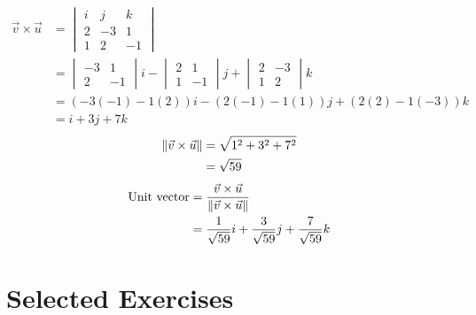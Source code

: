 \begin{align*}
    \vec{v} \times \vec{u} & = \begin{vmatrix}
                                   i & j  & k  \\
                                   2 & -3 & 1  \\
                                   1 & 2  & -1
                               \end{vmatrix}                      \\
                           & = \begin{vmatrix}
                                   -3 & 1  \\
                                   2  & -1
                               \end{vmatrix}i - \begin{vmatrix}
                                                    2 & 1  \\
                                                    1 & -1
                                                \end{vmatrix}j + \begin{vmatrix}
                                                                     2 & -3 \\
                                                                     1 & 2
                                                                 \end{vmatrix}k     \\
                           & = (-3(-1) - 1(2))i - (2(-1) - 1(1))j + (2(2) - 1(-3))k \\
                           & = i + 3j + 7k
\end{align*}
\begin{align*}
    \left\lVert\vec{v} \times \vec{u}\right\rVert & = \sqrt{1^2 + 3^2 + 7^2} \\
                                  & = \sqrt{59}
\end{align*}
\begin{align*}
    \text{Unit vector} & = \frac{\vec{v} \times \vec{u}}{\left\lVert\vec{v} \times \vec{u}\right\rVert}       \\
                       & = \frac{1}{\sqrt{59}}i + \frac{3}{\sqrt{59}}j + \frac{7}{\sqrt{59}}k
\end{align*}

\newpage

\section*{Selected Exercises}

